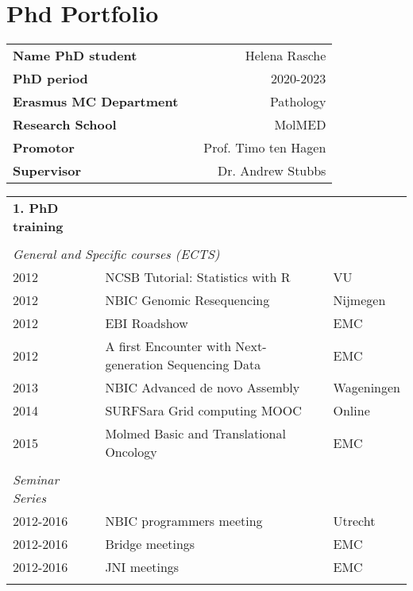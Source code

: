 \chapter{Phd Portfolio}
\label{AppendixE}

\tiny
\newpage
\begin{table}
    \begin{tabular}{lp{2cm}r}
        \textbf{Name PhD student}      && Helena Rasche \\
        \textbf{PhD period}            && 2020-2023 \\
        \textbf{Erasmus MC Department} && Pathology \\
        \textbf{Research School}       && MolMED \\
        \textbf{Promotor}              && Prof. Timo ten Hagen \\
        \textbf{Supervisor}            && Dr. Andrew Stubbs \\
    \end{tabular}
\end{table}

\vspace{-5cm}
\small

\begin{table}
    \begin{tabular}{lll}
        \textbf{1. PhD training} \\
        \\
        \multicolumn{3}{l}{\textit{General  and Specific courses (ECTS)}} \\
        2012 & NCSB Tutorial: Statistics with R                       & VU \\
        2012 & NBIC Genomic Resequencing                              & Nijmegen \\
        2012 & EBI Roadshow                                           & EMC \\
        2012 & A first Encounter with Next-generation Sequencing Data & EMC \\
        2013 & NBIC Advanced de novo Assembly                         & Wageningen \\
        2014 & SURFSara Grid computing MOOC                           & Online \\
        2015 & Molmed Basic and Translational Oncology                & EMC \\
        \\
        \textit{Seminar Series} \\
        2012-2016 & NBIC programmers meeting       & Utrecht \\
        2012-2016 & Bridge meetings                & EMC \\
        2012-2016 & JNI meetings                   & EMC \\
        \\
    \end{tabular}
\end{table}

